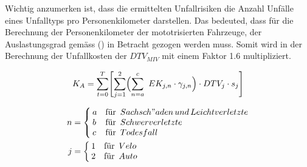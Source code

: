 \begin{IMleftrightskip}
Wichtig anzumerken ist, dass die ermittelten Unfallrisiken die Anzahl Unfälle eines Unfalltyps pro Personenkilometer darstellen. Das bedeuted, dass für die Berechnung der Personenkilometer der mototrisierten Fahrzeuge, der Auslastungsgrad gemäss (\cite{Mikrozensus2015}) in Betracht gezogen werden muss. Somit wird in der Berechnung der Unfallkosten der $DTV_{MIV}$ mit einem Faktor 1.6 multipliziert.
\end{IMleftrightskip}

\begin{equation}
K_{A} = \sum_{t=0}^T \Biggl[ \sum_{j=1}^2 \Bigl( \sum_{n=a}^c \ EK_{j,n} \cdot \gamma_{j,n} \Bigr) \cdot DTV_{j} \cdot s_j \Biggr] 
\label{eq.10}
\end{equation}

\begin{align*}
      n &=
      \begin{cases}
        \begin{aligned}
          & a  \\
          & b \\
          & c
        \end{aligned} &
        \begin{aligned}
         & \text{für}\ \thinspace \\
         & \text{für}\ \thinspace \\
         & \text{für}\ \thinspace
        \end{aligned}
        \begin{aligned}
          & {Sachsch"aden\,und\,Leichtverletzte} \\
          & {Schwerverletzte} \\
          & {Todesfall}
        \end{aligned}
      \end{cases}  \\
      j &=
      \begin{cases}
        \begin{aligned}
          & 1 \\
          & 2
        \end{aligned} &
        \begin{aligned}
         & \text{für}\ \thinspace \\
         & \text{für}\ \thinspace
        \end{aligned}
        \begin{aligned}
          & Velo \\
          & Auto
        \end{aligned}
      \end{cases} \\
\end{align*}

